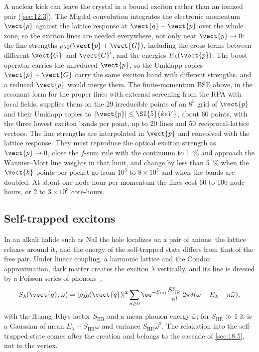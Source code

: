 A nuclear kick can leave the crystal in a bound exciton rather than an ionized pair (\cref{sec:12.3}). The Migdal convolution integrates the electronic momentum $\vect{p}$ against the lattice response at $\vect{q} - \vect{p}$ over the whole zone, so the exciton lines are needed everywhere, not only near $\vect{p}\to0$: the line strengths $\rho_{\lambda0}(\vect{p}+\vect{G})$, including the cross terms between different $\vect{G}$ and $\vect{G}'$, and the energies $E_\lambda(\vect{p})$. The boost operator carries the unreduced $\vect{p}$, so the Umklapp copies $\vect{p}+\vect{G}$ carry the same exciton band with different strengths, and a reduced $\vect{p}$ would merge them. The finite-momentum BSE above, in the resonant form for the proper lines with external screening from the RPA with local fields, supplies them on the 29 irreducible points of an $8^3$ grid of $\vect{p}$ and their Umklapp copies to $|\vect{p}| \le \SI{5}{keV}$, about 60 points, with the three lowest exciton bands per point, up to 20 lines and 50 reciprocal-lattice vectors. The line strengths are interpolated in $\vect{p}$ and convolved with the lattice response. They must reproduce the optical exciton strength as $\vect{p}\to0$, close the $f$-sum rule with the continuum to \SI{1}{\percent} and approach the Wannier--Mott line weights in that limit, and change by less than \SI{5}{\percent} when the $\vect{k}$ points per pocket go from $10^3$ to $8\times10^3$ and when the bands are doubled. At about one node-hour per momentum the lines cost 60 to 100 node-hours, or 2 to $3\times10^3$ core-hours.

\subsection{Self-trapped excitons}

In an alkali halide such as NaI the hole localizes on a pair of anions, the lattice relaxes around it, and the energy of the self-trapped state differs from that of the free pair. Under linear coupling, a harmonic lattice and the Condon approximation, dark matter creates the exciton $\lambda$ vertically, and its line is dressed by a Poisson series of phonons~\cite{huang1950theory},
\begin{equation}
  S_\lambda(\vect{q},\omega) = |\rho_{\lambda0}(\vect{q})|^2\sum_{n\ge0}\ee^{-S_{\mathrm{HR}}}\frac{S_{\mathrm{HR}}^n}{n!}\,2\pi\delta(\omega - E_\lambda - n\bar\omega) ,
  \label{eq:E.15-ste}
\end{equation}
with the Huang--Rhys factor $S_{\mathrm{HR}}$ and a mean phonon energy $\bar\omega$; for $S_{\mathrm{HR}} \gg 1$ it is a Gaussian of mean $E_\lambda + S_{\mathrm{HR}}\bar\omega$ and variance $S_{\mathrm{HR}}\bar\omega^2$. The relaxation into the self-trapped state comes after the creation and belongs to the cascade of \cref{sec:18.5}, not to the vertex.

